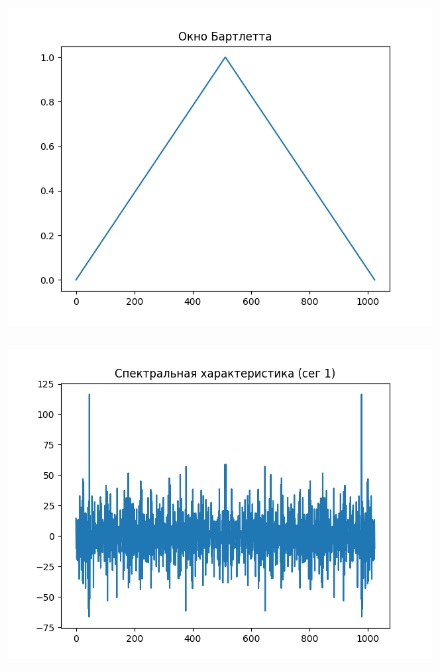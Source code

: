 \documentclass[12pt]{article}
\begin{document}
\begin{figure}[!htb]
\centering
\includegraphics[scale=1.00]{bart_window.png}
\caption{}
\label{}
\end{figure}

\begin{figure}[!htb]
\centering
\includegraphics[scale=1.00]{spec_1.png}
\caption{}
\label{}
\end{figure}
\end{document}
